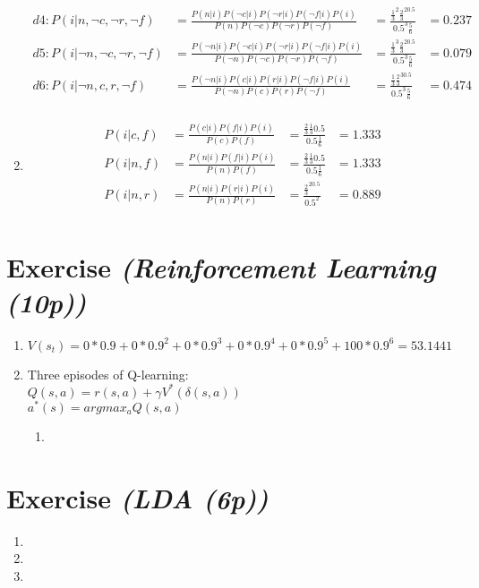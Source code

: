 \documentclass{article}
\begin{document}
\begin{enumerate}
\begin{align*}
            d4: P(i|n,\lnot c,\lnot r,\lnot f) &=\frac{P(n|i)P(\lnot c|i)P(\lnot r|i)P(\lnot
        f|i)P(i)}{P(n)P(\lnot c)P(\lnot r)P(\lnot f)} &=
            \frac{\frac{1}{3}^2\frac{2}{3}^20.5}{0.5^3\frac{5}{6}} &= 0.237\\
            d5: P(i|\lnot n,\lnot c,\lnot r,\lnot f) &=\frac{P(\lnot n|i)P(\lnot c|i)P(\lnot r|i)P(\lnot
        f|i)P(i)}{P(\lnot n)P(\lnot c)P(\lnot r)P(\lnot f)} &=
            \frac{\frac{1}{3}^3\frac{2}{3}^20.5}{0.5^3\frac{5}{6}} &= 0.079\\
            d6: P(i|\lnot n,c,r,\lnot f) &=\frac{P(\lnot n|i)P(c|i)P(r|i)P(\lnot
        f|i)P(i)}{P(\lnot n)P(c)P(r)P(\lnot f)} &=
            \frac{\frac{1}{3}\frac{2}{3}^30.5}{0.5^3\frac{5}{6}} &= 0.474\\
        \end{align*}
    \item
        \begin{align*}
            P(i|c,f) &=\frac{P(c|i)P(f|i)P(i)}{P(c)P(f)} &=
            \frac{\frac{2}{3}\frac{1}{3}0.5}{0.5\frac{1}{6}} &= 1.333\\
            P(i|n,f) &=\frac{P(n|i)P(f|i)P(i)}{P(n)P(f)} &=
            \frac{\frac{2}{3}\frac{1}{3}0.5}{0.5\frac{1}{6}} &= 1.333\\
            P(i|n,r) &=\frac{P(n|i)P(r|i)P(i)}{P(n)P(r)} &=
            \frac{\frac{2}{3}^20.5}{0.5^2} &= 0.889\\
        \end{align*}
\end{enumerate}

\section{Exercise \textit{(Reinforcement Learning (10p))}}
\begin{enumerate}
    \item $V(s_t) = 0*0.9+0*0.9^2+0*0.9^3+0*0.9^4+0*0.9^5+100*0.9^6 = 53.1441 $
    \item Three episodes of Q-learning:\\
        $Q(s,a) = r(s,a) + \gamma V^*(\delta(s,a))$\\
        $a^*(s) =  argmax_a Q(s,a)$
        \begin{enumerate}
            \item
        \end{enumerate}
\end{enumerate}

\section{Exercise \textit{(LDA (6p))}}
\begin{enumerate}
    \item
    \item
    \item
\end{enumerate}
\end{document}
